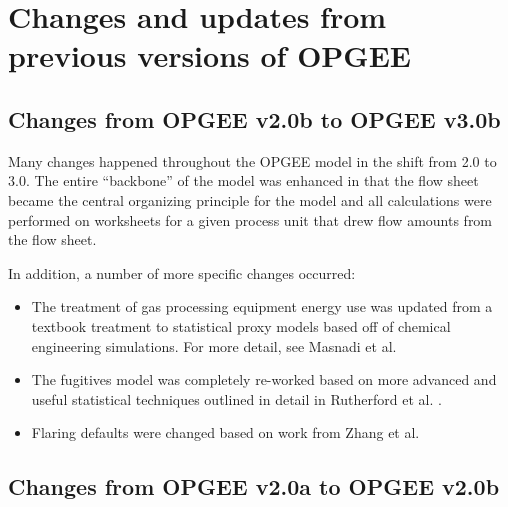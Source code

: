 \documentclass[11pt]{report}
\begin{document}
\chapter{Changes and updates from previous versions of OPGEE}




\section{Changes from OPGEE v2.0b to OPGEE v3.0b}

Many changes happened throughout the OPGEE model in the shift from 2.0 to 3.0. The entire ``backbone'' of the model was enhanced in that the flow sheet became the central organizing principle for the model and all calculations were performed on worksheets for a given process unit that drew flow amounts from the flow sheet.

In addition, a number of more specific changes occurred:
\begin{itemize}
\item The treatment of gas processing equipment energy use was updated from a textbook treatment to statistical proxy models based off of chemical engineering simulations. For more detail, see Masnadi et al. \cite{Masnadi2020}
\item The fugitives model was completely re-worked based on more advanced and useful statistical techniques outlined in detail in Rutherford et al. \cite{Rutherford2021}.
\item Flaring defaults were changed based on work from Zhang et al. \cite{Zhang2021}
\end{itemize}



\section{Changes from OPGEE v2.0a to OPGEE v2.0b}
\end{document}
